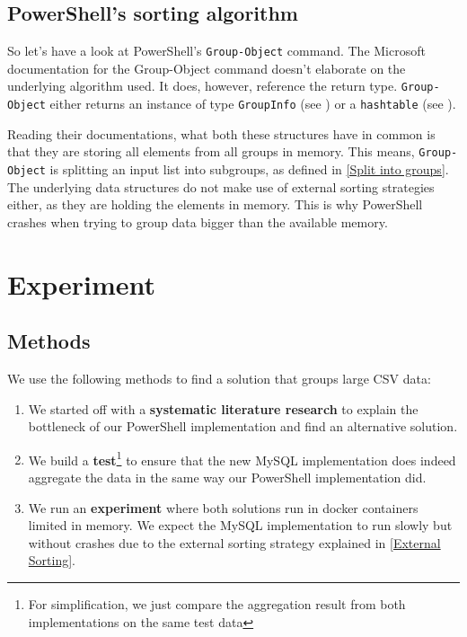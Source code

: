 \subsection{PowerShell's sorting algorithm} \label{PowerShell Sorting}

So let's have a look at \gls{PowerShell}'s \verb+Group-Object+ command.
The Microsoft documentation \cite{docPSGO} for the Group-Object
command doesn't elaborate on the underlying algorithm used.
It does, however, reference the return type.
\verb+Group-Object+ either returns an instance of type
\verb+GroupInfo+ (see \cite{docPSGI})
or a \verb+hashtable+ (see \cite{docPSHT}).

Reading their documentations, what both these structures have in common
is that they are storing all elements from all groups in memory. This means,
\verb+Group-Object+ is splitting an input list into subgroups,
as defined in \ref{Split into groups}. The underlying data structures
do not make use of external sorting strategies either, as they are
holding the elements in memory. This is why \gls{PowerShell} crashes when
trying to group data bigger than the available memory.

\newpage

\section{Experiment}

\subsection{Methods}

We use the following methods to find a solution that groups large \gls{CSV} data:

\begin{enumerate}
    \item We started off with a \textbf{systematic literature research}
        to explain the bottleneck of our \gls{PowerShell} implementation
        and find an alternative solution.
    \item We build a \textbf{test}\footnote{For simplification,
        we just compare the aggregation result from both
        implementations on the same test data} to ensure that the new
        \gls{MySQL} implementation does indeed aggregate the data in the same way
        our \gls{PowerShell} implementation did.
    \item We run an \textbf{experiment} where both solutions run in
        docker containers limited in memory. We expect the \gls{MySQL} implementation
        to run slowly but without crashes due to the external sorting
        strategy explained in \ref{External Sorting}.
\end{enumerate}

